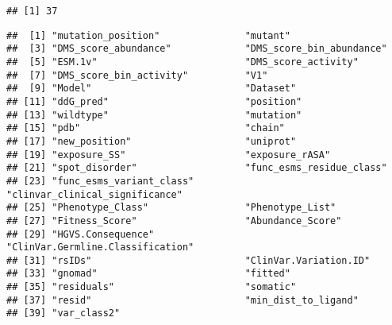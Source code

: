 \documentclass[
]{article}
\newenvironment{Shaded}{\begin{snugshade}}{\end{snugshade}}
\newcommand{\FunctionTok}[1]{\textcolor[rgb]{0.13,0.29,0.53}{\textbf{#1}}}
\newcommand{\NormalTok}[1]{#1}
\newcommand{\OtherTok}[1]{\textcolor[rgb]{0.56,0.35,0.01}{#1}}
\newcommand{\SpecialCharTok}[1]{\textcolor[rgb]{0.81,0.36,0.00}{\textbf{#1}}}
\newcommand{\StringTok}[1]{\textcolor[rgb]{0.31,0.60,0.02}{#1}}
\begin{document}
\begin{verbatim}
## [1] 37
\end{verbatim}

\begin{Shaded}
\end{Shaded}

\begin{verbatim}
##  [1] "mutation_position"               "mutant"                         
##  [3] "DMS_score_abundance"             "DMS_score_bin_abundance"        
##  [5] "ESM.1v"                          "DMS_score_activity"             
##  [7] "DMS_score_bin_activity"          "V1"                             
##  [9] "Model"                           "Dataset"                        
## [11] "ddG_pred"                        "position"                       
## [13] "wildtype"                        "mutation"                       
## [15] "pdb"                             "chain"                          
## [17] "new_position"                    "uniprot"                        
## [19] "exposure_SS"                     "exposure_rASA"                  
## [21] "spot_disorder"                   "func_esms_residue_class"        
## [23] "func_esms_variant_class"         "clinvar_clinical_significance"  
## [25] "Phenotype_Class"                 "Phenotype_List"                 
## [27] "Fitness_Score"                   "Abundance_Score"                
## [29] "HGVS.Consequence"                "ClinVar.Germline.Classification"
## [31] "rsIDs"                           "ClinVar.Variation.ID"           
## [33] "gnomad"                          "fitted"                         
## [35] "residuals"                       "somatic"                        
## [37] "resid"                           "min_dist_to_ligand"             
## [39] "var_class2"
\end{verbatim}
\end{document}
